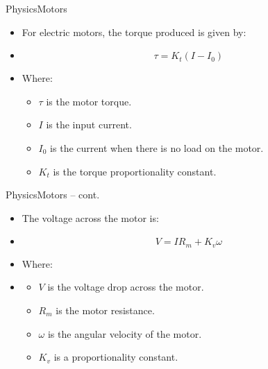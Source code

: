 \documentclass[8pt]{beamer}
\newcommand{\Ytri}{$\triangleright$ }
\renewcommand{\|}[1][.3em]{\hspace{#1}|\hspace{#1}}
\renewcommand{\,}[1][.3em]{,\hspace{#1}}
\newcommand{\subitem}{\item[\Ytri]}
\begin{document}
\begin{frame}{Physics}{Motors}
    \begin{itemize}
    \item For electric motors, the torque produced is given by:
    \item[] \begin{equation}
    \tau = K_t(I-I_0)
    \end{equation}
    \pause
    \item Where:
    \begin{itemize}
        \subitem $\tau$ is the motor torque.
        \subitem $I$ is the input current.
        \subitem $I_0$ is the current when there is no load on the motor.
        \subitem $K_t$ is the torque proportionality constant.
    \end{itemize}
    \end{itemize}
\end{frame}

\begin{frame}{Physics}{Motors -- cont.}
    \begin{itemize}
    \item The voltage across the motor is:
    \item[] \begin{equation}
    V = IR_m + K_v\omega
    \end{equation}
    \pause
    \item Where:
    \item[] \begin{itemize}
        \subitem $V$ is the voltage drop across the motor.
        \subitem $R_m$ is the motor resistance.
        \subitem $\omega$ is the angular velocity of the motor.
        \subitem $K_v$ is a proportionality constant.
    \end{itemize}
    \end{itemize}
\end{frame}
\end{document}

